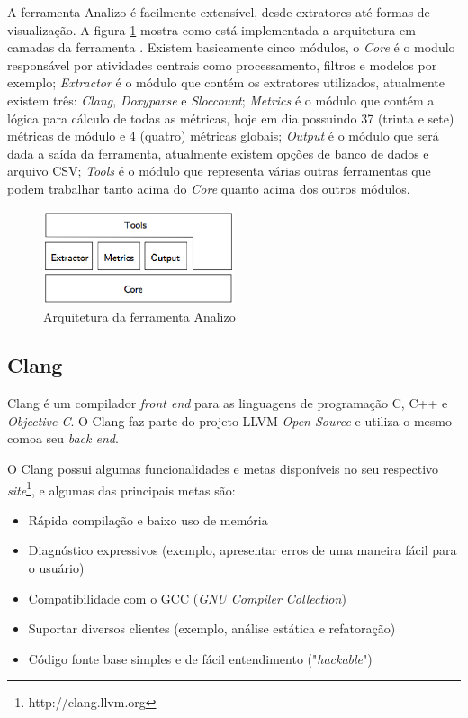 A ferramenta Analizo é facilmente extensível, desde extratores até formas de visualização. A figura \ref{archanalizo} mostra
como está implementada a arquitetura em camadas da ferramenta \cite{analizoartigo}. Existem basicamente cinco módulos, o 
\textit{Core} é o modulo responsável por atividades centrais como processamento, filtros e modelos por exemplo; 
\textit{Extractor} é o módulo que contém os extratores utilizados, atualmente existem três: \textit{Clang}, \textit{Doxyparse}
e \textit{Sloccount}; \textit{Metrics} é o módulo que contém a lógica para cálculo de todas as métricas, hoje em dia possuindo
37 (trinta e sete) métricas de módulo e 4 (quatro) métricas globais; \textit{Output} é o módulo que será dada a saída da 
ferramenta, atualmente existem opções de banco de dados e arquivo CSV; \textit{Tools} é o módulo que representa várias outras
ferramentas que podem trabalhar tanto acima do \textit{Core} quanto acima dos outros módulos.

\begin{figure}[h]
  \centering
  \includegraphics[width=0.5\textwidth]
      {figuras/analizo.eps}
  \caption{Arquitetura da ferramenta Analizo}
  \label{archanalizo}
\end{figure}

\subsection{Clang}

Clang é um compilador \textit{front end} para as linguagens de programação C, C++ e \textit{Objective-C}. O Clang faz parte
do projeto LLVM \textit{Open Source} e utiliza o mesmo comoa seu \textit{back end}. 

O Clang possui algumas funcionalidades e metas disponíveis no seu respectivo \textit{site}\footnote{http://clang.llvm.org}, e
algumas das principais metas são:

\begin{itemize}
  \item Rápida compilação e baixo uso de memória
  \item Diagnóstico expressivos (exemplo, apresentar erros de uma maneira fácil para o usuário)
  \item Compatibilidade com o GCC (\textit{GNU Compiler Collection})
  \item Suportar diversos clientes (exemplo, análise estática e refatoração)
  \item Código fonte base simples e de fácil entendimento ("\textit{hackable}")
\end{itemize}

